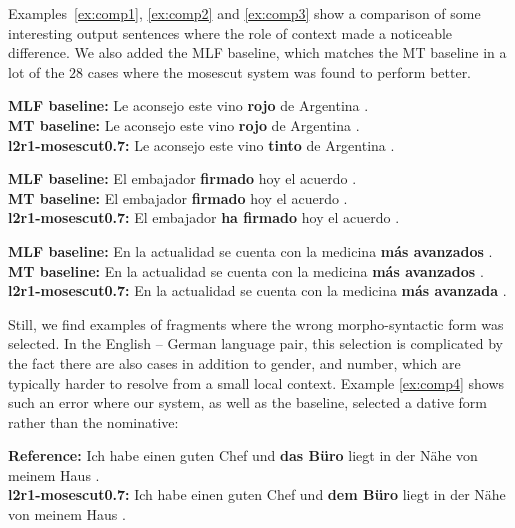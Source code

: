 Examples~\ref{ex:comp1}, \ref{ex:comp2} and \ref{ex:comp3} show a comparison of
some interesting output sentences where the role of context made a noticeable
difference. We also added the MLF baseline, which matches the MT baseline in a
lot of the $28$ cases where the mosescut system was found to perform better.

\begin{exmp}
\textbf{MLF baseline:} Le aconsejo este vino \textbf{rojo} de Argentina . \\
\textbf{MT baseline:} Le aconsejo este vino \textbf{rojo} de Argentina . \\
\textbf{l2r1-mosescut0.7:} Le aconsejo este vino \textbf{tinto} de Argentina .  \\
\label{ex:comp1}
\end{exmp}

\begin{exmp}
\textbf{MLF baseline:} El embajador \textbf{firmado} hoy el acuerdo . \\
\textbf{MT baseline:} El embajador \textbf{firmado} hoy el acuerdo . \\
\textbf{l2r1-mosescut0.7:} El embajador \textbf{ha firmado} hoy el acuerdo . \\
\label{ex:comp2}
\end{exmp}

\begin{exmp}
\textbf{MLF baseline:} En la actualidad se cuenta con la medicina \textbf{más avanzados} . \\
\textbf{MT baseline:} En la actualidad se cuenta con la medicina \textbf{más avanzados} . \\
\textbf{l2r1-mosescut0.7:} En la actualidad se cuenta con la medicina \textbf{más avanzada} . \\
\label{ex:comp3}
\end{exmp}

Still, we find examples of fragments where the wrong morpho-syntactic form was
selected. In the English -- German language pair, this selection is complicated
by the fact there are also cases in addition to gender, and number, which are
typically harder to resolve from a small local context. Example \ref{ex:comp4}
shows such an error where our system, as well as the baseline, selected a
dative form rather than the nominative:

\begin{exmp}
\textbf{Reference: } Ich habe einen guten Chef und \textbf{das Büro} liegt in der Nähe von meinem Haus  . \\
\textbf{l2r1-mosescut0.7: } Ich habe einen guten Chef und \textbf{dem Büro} liegt in der Nähe von meinem Haus  .\\
\label{ex:comp4}
\end{exmp}

